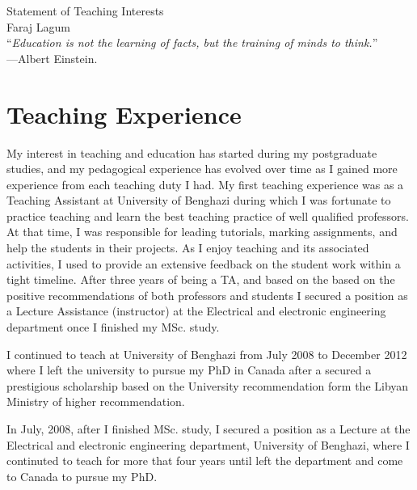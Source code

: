 \documentclass[11pt]{article}
\begin{document}
\begin{center}
{\Large Statement of Teaching Interests} \\[.3in]
{\large Faraj Lagum}\\
\vspace*{.5in}
{``\emph{Education is not the learning of facts, but the training of minds to think.}'' \\ ---Albert Einstein.}
\end{center}








\section{Teaching Experience}


My interest in teaching and education has started during my postgraduate studies, and my pedagogical experience has evolved over time as I gained more experience from each teaching duty I had. My first teaching experience was as a Teaching Assistant at University of Benghazi during which I was fortunate to practice teaching and learn the best teaching practice of well qualified professors. At that time, I was responsible for leading tutorials, marking assignments, and help the students in their projects. As I enjoy teaching and its associated activities, I used to provide an extensive feedback on the student work within a tight timeline. After three years of being a TA, and based on the based on the positive recommendations of both professors and students I secured a position as a Lecture Assistance (instructor) at the Electrical and electronic engineering department once I finished my MSc. study. 

I continued to teach at University of Benghazi from July 2008 to December  2012 where I left the university to pursue my PhD in Canada after a secured a prestigious scholarship based on the University recommendation form the Libyan Ministry of higher recommendation.  

In July, 2008, after I finished MSc. study, I secured a position as a Lecture at the Electrical and electronic engineering department, University of Benghazi,  where I continuted to teach for more that four years until left the department and come to Canada to pursue my PhD. 
\end{document}
